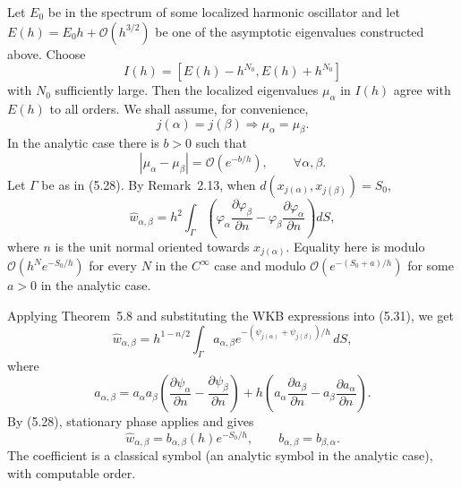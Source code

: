 \documentclass[11pt,a4paper]{article}
\newcommand{\cO}{\mathcal O}
\numberwithin{equation}{section}
\theoremstyle{remark}
\begin{document}
Let $E_0$ be in the spectrum of some localized harmonic oscillator and let
$E(h)=E_0h+\cO(h^{3/2})$ be one of the asymptotic eigenvalues constructed above. Choose
\[
I(h)=[E(h)-h^{N_0},E(h)+h^{N_0}]
\]
with $N_0$ sufficiently large. Then the localized eigenvalues $\mu_\alpha$ in $I(h)$ agree with $E(h)$ to all orders. We shall assume, for convenience,
\begin{equation}
j(\alpha)=j(\beta)\Longrightarrow\mu_\alpha=\mu_\beta.
\tag{5.29}
\end{equation}
In the analytic case there is $b>0$ such that
\begin{equation}
|\mu_\alpha-\mu_\beta|=\cO(e^{-b/h}),
\qquad\forall\alpha,\beta.
\tag{5.30}
\end{equation}
Let $\Gamma$ be as in (5.28). By Remark~2.13, when $d(x_{j(\alpha)},x_{j(\beta)})=S_0$,
\begin{equation}
\widehat w_{\alpha,\beta}
=h^2\int_\Gamma
\left(
\varphi_\alpha\frac{\partial\varphi_\beta}{\partial n}
-\varphi_\beta\frac{\partial\varphi_\alpha}{\partial n}
\right)dS,
\tag{5.31}
\end{equation}
where $n$ is the unit normal oriented towards $x_{j(\alpha)}$. Equality here is modulo $\cO(h^N e^{-S_0/h})$ for every $N$ in the $C^\infty$ case and modulo $\cO(e^{-(S_0+a)/h})$ for some $a>0$ in the analytic case.

Applying Theorem~5.8 and substituting the WKB expressions into (5.31), we get
\begin{equation}
\widehat w_{\alpha,\beta}
=h^{1-n/2}\int_\Gamma
 a_{\alpha,\beta}
 e^{-(\psi_{j(\alpha)}+\psi_{j(\beta)})/h}\,dS,
\tag{5.32}
\end{equation}
where
\begin{equation}
a_{\alpha,\beta}
=a_\alpha a_\beta\left(
\frac{\partial\psi_\alpha}{\partial n}
-\frac{\partial\psi_\beta}{\partial n}
\right)
+h\left(
 a_\alpha\frac{\partial a_\beta}{\partial n}
-a_\beta\frac{\partial a_\alpha}{\partial n}
\right).
\tag{5.33}
\end{equation}
By (5.28), stationary phase applies and gives
\begin{equation}
\widehat w_{\alpha,\beta}=b_{\alpha,\beta}(h)e^{-S_0/h},
\qquad b_{\alpha,\beta}=b_{\beta,\alpha}.
\tag{5.34}
\end{equation}
The coefficient is a classical symbol (an analytic symbol in the analytic case), with computable order.
\end{document}
